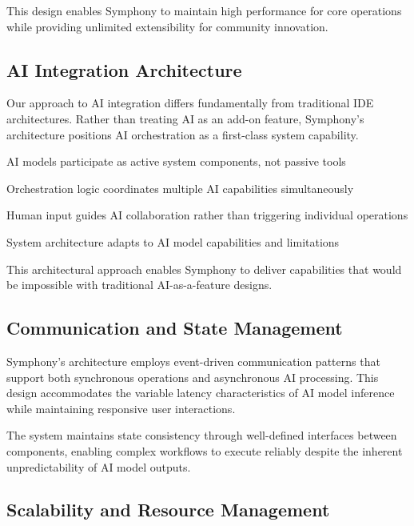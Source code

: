 This design enables Symphony to maintain high performance for core operations while providing unlimited extensibility for community innovation.

\subsection*{AI Integration Architecture}

Our approach to AI integration differs fundamentally from traditional IDE architectures. Rather than treating AI as an add-on feature, Symphony's architecture positions AI orchestration as a \textcolor{brandAccent}{first-class system capability}.

\begin{infobox}[title=AI-First Design Principles]
\begin{compactlist}
    \item AI models participate as active system components, not passive tools
    \item Orchestration logic coordinates multiple AI capabilities simultaneously
    \item Human input guides AI collaboration rather than triggering individual operations
    \item System architecture adapts to AI model capabilities and limitations
\end{compactlist}
\end{infobox}

This architectural approach enables Symphony to deliver capabilities that would be impossible with traditional AI-as-a-feature designs.

\subsection*{Communication and State Management}

Symphony's architecture employs \textcolor{brandTertiary}{event-driven communication} patterns that support both synchronous operations and asynchronous AI processing. This design accommodates the variable latency characteristics of AI model inference while maintaining responsive user interactions.

The system maintains state consistency through well-defined interfaces between components, enabling complex workflows to execute reliably despite the inherent unpredictability of AI model outputs.

\subsection*{Scalability and Resource Management}

